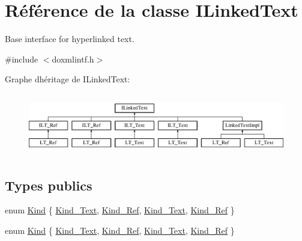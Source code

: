 \hypertarget{class_i_linked_text}{}\section{Référence de la classe I\+Linked\+Text}
\label{class_i_linked_text}


Base interface for hyperlinked text.  




{\ttfamily \#include $<$doxmlintf.\+h$>$}

Graphe d\textquotesingle{}héritage de I\+Linked\+Text\+:\begin{figure}[H]
\begin{center}
\leavevmode
\includegraphics[height=2.745098cm]{class_i_linked_text}
\end{center}
\end{figure}
\subsection*{Types publics}
\begin{DoxyCompactItemize}
\item 
enum \hyperlink{class_i_linked_text_af18c37822f4819c58c07b327b459c5af}{Kind} \{ \hyperlink{class_i_linked_text_af18c37822f4819c58c07b327b459c5afa95afd4442ccbef1f58b85d0cab4c2a2f}{Kind\+\_\+\+Text}, 
\hyperlink{class_i_linked_text_af18c37822f4819c58c07b327b459c5afaad0dcb08386467d24cc4cd4c13fc431d}{Kind\+\_\+\+Ref}, 
\hyperlink{class_i_linked_text_af18c37822f4819c58c07b327b459c5afa95afd4442ccbef1f58b85d0cab4c2a2f}{Kind\+\_\+\+Text}, 
\hyperlink{class_i_linked_text_af18c37822f4819c58c07b327b459c5afaad0dcb08386467d24cc4cd4c13fc431d}{Kind\+\_\+\+Ref}
 \}
\item 
enum \hyperlink{class_i_linked_text_af18c37822f4819c58c07b327b459c5af}{Kind} \{ \hyperlink{class_i_linked_text_af18c37822f4819c58c07b327b459c5afa95afd4442ccbef1f58b85d0cab4c2a2f}{Kind\+\_\+\+Text}, 
\hyperlink{class_i_linked_text_af18c37822f4819c58c07b327b459c5afaad0dcb08386467d24cc4cd4c13fc431d}{Kind\+\_\+\+Ref}, 
\hyperlink{class_i_linked_text_af18c37822f4819c58c07b327b459c5afa95afd4442ccbef1f58b85d0cab4c2a2f}{Kind\+\_\+\+Text}, 
\hyperlink{class_i_linked_text_af18c37822f4819c58c07b327b459c5afaad0dcb08386467d24cc4cd4c13fc431d}{Kind\+\_\+\+Ref}
 \}
\end{DoxyCompactItemize}
